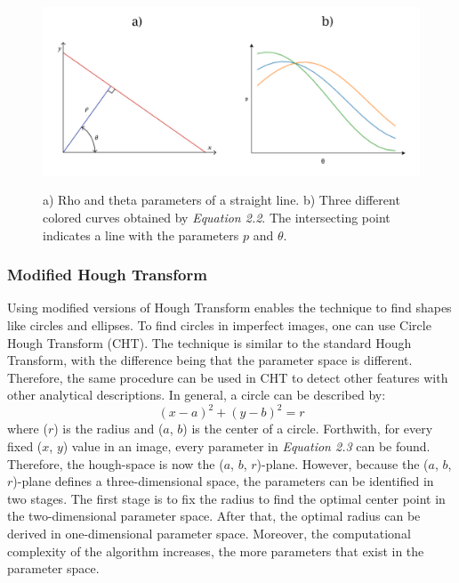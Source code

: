 \begin{figure}[H]
    \centering
     \includegraphics[width=1\linewidth]{figures/PDF/Hough_graph.pdf}\\
    \caption{a) Rho and theta parameters of a straight line\cite{Duda}. b) Three different colored curves obtained by \textit{Equation 2.2}. The intersecting point indicates a line with the parameters $p$ and $\theta$.}
    \label{fig:hough graph}
\end{figure}

\subsubsection{Modified Hough Transform}
Using modified versions of Hough Transform enables the technique to find shapes like circles and ellipses. To find circles in imperfect images, one can use Circle Hough Transform (CHT). The technique is similar to the standard Hough Transform, with the difference being that the parameter space is different. Therefore, the same procedure can be used in CHT to detect other features with other analytical descriptions. In general,  a circle can be described by: \begin{equation} {(x-a)}^2 + {(y-b)}^2 = r \end{equation} where ($r$) is the radius and ($a$, $b$) is the center of a circle. Forthwith, for every fixed ($x$, $y$) value in an image, every parameter in \textit{Equation 2.3} can be found. Therefore, the hough-space is now the ($a$, $b$, $r$)-plane. However, because the ($a$, $b$, $r$)-plane defines a three-dimensional space, the parameters can be identified in two stages. The first stage is to fix the radius to find the optimal center point in the two-dimensional parameter space. After that, the optimal radius can be derived in one-dimensional parameter space. Moreover, the computational complexity of the algorithm increases, the more parameters that exist in the parameter space. \\


